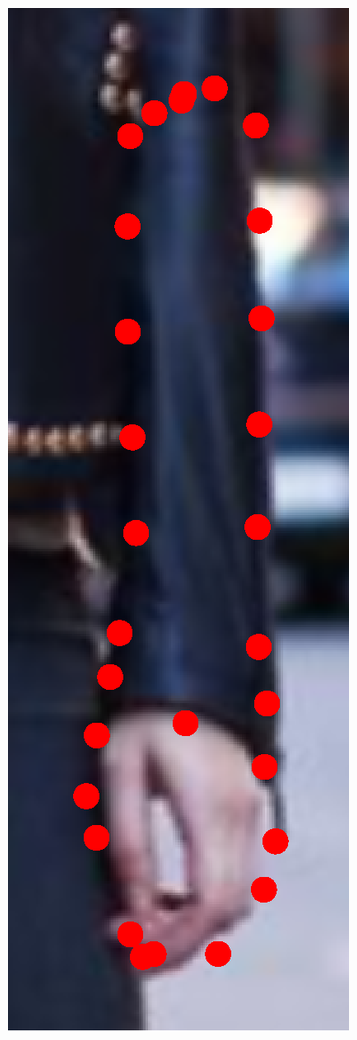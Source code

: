 \begin{figure}[!t]
    \hfill
    \includegraphics[height=\ofh]{resources/Fittings/38.eps}
    \hfill

\end{figure}
